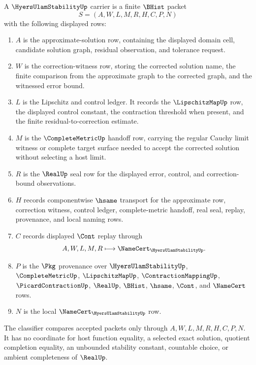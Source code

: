 \begin{definition}
\label{def:hyers-ulam-stability-carrier}
A $\HyersUlamStabilityUp$ carrier is a finite $\BHist$ packet
$$
S=(A,W,L,M,R,H,C,P,N)
$$
with the following displayed rows:
\begin{enumerate}
\item $A$ is the approximate-solution row, containing the displayed domain cell, candidate solution graph, residual observation, and tolerance request.
\item $W$ is the correction-witness row, storing the corrected solution name, the finite comparison from the approximate graph to the corrected graph, and the witnessed error bound.
\item $L$ is the Lipschitz and control ledger. It records the $\LipschitzMapUp$ row, the displayed control constant, the contraction threshold when present, and the finite residual-to-correction estimate.
\item $M$ is the $\CompleteMetricUp$ handoff row, carrying the regular Cauchy limit witness or complete target surface needed to accept the corrected solution without selecting a host limit.
\item $R$ is the $\RealUp$ seal row for the displayed error, control, and correction-bound observations.
\item $H$ records componentwise $\hsame$ transport for the approximate row, correction witness, control ledger, complete-metric handoff, real seal, replay, provenance, and local naming rows.
\item $C$ records displayed $\Cont$ replay through
$$
A,W,L,M,R \longmapsto \NameCert_{\HyersUlamStabilityUp}.
$$
\item $P$ is the $\Pkg$ provenance over $\HyersUlamStabilityUp$, $\CompleteMetricUp$, $\LipschitzMapUp$, $\ContractionMappingUp$, $\PicardContractionUp$, $\RealUp$, $\BHist$, $\hsame$, $\Cont$, and $\NameCert$ rows.
\item $N$ is the local $\NameCert_{\HyersUlamStabilityUp}$ row.
\end{enumerate}
The classifier compares accepted packets only through $A,W,L,M,R,H,C,P,N$. It has no coordinate for host function equality, a selected exact solution, quotient completion equality, an unbounded stability constant, countable choice, or ambient completeness of $\RealUp$.
\end{definition}

